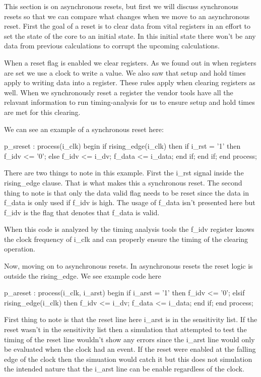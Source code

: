 This section is on asynchronous resets, but first we will discuss synchronous resets so that we can compare what changes when we move to an asynchronous reset. First the goal of a reset is to clear data from vital registers in an effort to set the state of the core to an initial state. In this initial state there won't be any data from previous calculations to corrupt the upcoming calculations. 

When a reset flag is enabled we clear registers. As we found out in  when registers are set we use a clock to write a value. We also saw that setup and hold times apply to writing data into a register. These rules apply when clearing registers as well. When we synchronously reset a register the vendor tools have all the relavant information to run timing-analysis for us to ensure setup and hold times are met for this clearing. 

We can see an example of a synchronous reset here:

\begin{VHDLlisting}[tabsize=4]
p_sreset : process(i_clk)
begin
	if rising_edge(i_clk) then
		if i_rst = '1' then
			f_idv <= '0';
		else
			f_idv <= i_dv;
			f_data <= i_data;		
		end if;	
	end if;
end process;
\end{VHDLlisting}

There are two things to note in this example. First the i\_rst signal inside the rising\_edge clause. That is what makes this a synchronous reset. The second thing to note is that only the data valid flag needs to be reset since the data in f\_data is only used if f\_idv is high. The usage of f\_data isn't presented here but f\_idv is the flag that denotes that f\_data is valid. 

When this code is analyzed by the timing analysis tools the f\_idv register knows the clock frequency of i\_clk and can properly ensure the timing of the clearing operation. 

Now, moving on to asynchronous resets. In asynchronous resets the reset logic is outside the rising\_edge. We see example code here

\begin{VHDLlisting}[tabsize=4]
p_areset : process(i_clk, i_arst)
begin
	if i_arst = '1' then
		f_idv <= '0';
	elsif rising_edge(i_clk) then
		f_idv <= i_dv;
		f_data <= i_data;		
	end if;
end process;
\end{VHDLlisting}

First thing to note is that the reset line here i\_arst is in the sensitivity list. If the reset wasn't in the sensitivity list then a simulation that attempted to test the timing of the reset line wouldn't show any errors since the i\_arst line would only be evaluated when the clock had an event. If the reset were enabled at the falling edge of the clock then the simuation would catch it but this does not simulation the intended nature that the i\_arst line can be enable regardless of the clock. 

